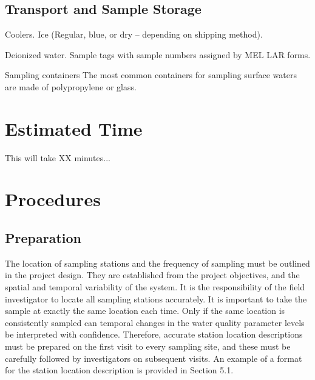 \documentclass[12pt]{../SOP4_alpha}\usepackage[]{graphicx}\usepackage[]{xcolor}
\begin{document}
\subsection{Transport and Sample Storage}

\begin{itemize*}
\item Coolers.  Ice (Regular, blue, or dry – depending on shipping method).  

\item Deionized water.  Sample tags with sample numbers assigned by MEL  LAR forms.  

\item Sampling containers  The most common containers for sampling surface waters are made of polypropylene or glass. %

\end{itemize*}

\section{Estimated Time}

\NP This will take XX minutes...

\section{Procedures}

\subsection{Preparation}

\NP The location of sampling stations and the frequency of sampling must be outlined in the project design. They are established from the project objectives, and the spatial and temporal variability of the system. It is the responsibility of the field investigator to locate all sampling stations accurately. It is important to take the sample at exactly the same location each time. Only if the same location is consistently sampled can temporal changes in the water quality parameter levels be interpreted with confidence. Therefore, accurate station location descriptions must be prepared on the first visit to every sampling site, and these must be carefully followed by investigators on subsequent visits. An example of a format for the station location description is provided in Section 5.1.
\end{document}
